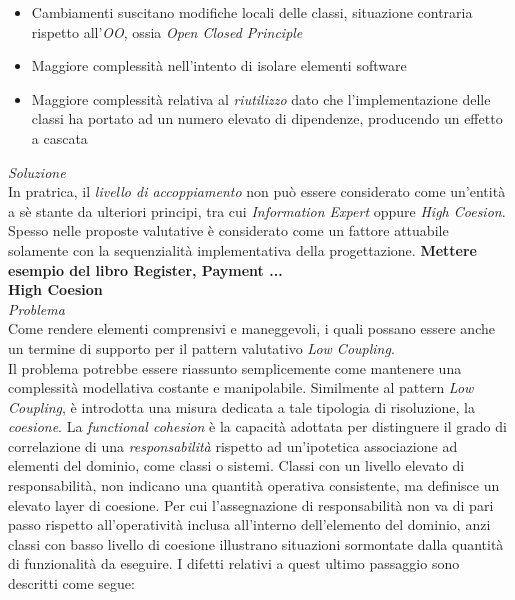 \documentclass{article}
\begin{document}
\begin{itemize}[label={-}]
    \itemsep0em
    \item Cambiamenti suscitano modifiche locali delle classi, situazione contraria rispetto all'\textit{OO}, ossia \textit{Open Closed Principle}
    \item Maggiore complessità nell'intento di isolare elementi software
    \item Maggiore complessità relativa al \textit{riutilizzo} dato che l'implementazione delle classi ha portato ad un numero elevato di dipendenze, producendo un effetto a cascata
\end{itemize}\vspace*{7pt}
\textit{Soluzione}\\
In pratrica, il \textit{livello di accoppiamento} non può essere considerato come un'entità a sè stante da ulteriori principi, tra cui \textit{Information Expert} oppure \textit{High Coesion}. Spesso nelle proposte valutative è considerato come un fattore attuabile solamente con la sequenzialità implementativa della progettazione. \textbf{Mettere esempio del libro Register, Payment ...}\vspace*{14pt}\\
\textbf{High Coesion}\vspace*{7pt}\\
\textit{Problema}\\
Come rendere elementi comprensivi e maneggevoli, i quali possano essere anche un termine di supporto per il pattern valutativo \textit{Low Coupling}.\vspace*{14pt}\\
Il problema potrebbe essere riassunto semplicemente come mantenere una complessità modellativa costante e manipolabile. Similmente al pattern \textit{Low Coupling}, è introdotta una misura dedicata a tale tipologia di risoluzione, la \textit{coesione}. La \textit{functional cohesion} è la capacità adottata per distinguere il grado di correlazione di una \textit{responsabilità} rispetto ad un'ipotetica associazione ad elementi del dominio, come classi o sistemi. Classi con un livello elevato di responsabilità, non indicano una quantità operativa consistente, ma definisce un elevato layer di coesione. Per cui l'assegnazione di responsabilità non va di pari passo rispetto all'operatività inclusa all'interno dell'elemento del dominio, anzi classi con basso livello di coesione illustrano situazioni sormontate dalla quantità di funzionalità da eseguire. I difetti relativi a quest ultimo passaggio sono descritti come segue:
\end{document}
